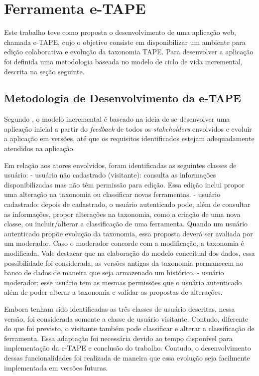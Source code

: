 \chapter[Ferramenta]{Ferramenta e-TAPE}
\label{cap:cap3}
Este trabalho teve como proposta o desenvolvimento de uma aplicação web, chamada e-TAPE, cujo o objetivo consiste em disponibilizar um ambiente para edição colaborativa e evolução da taxonomia TAPE.
Para desenvolver a aplicação foi definida uma metodologia baseada no modelo de ciclo de vida incremental, descrita na seção seguinte.

\section {Metodologia de Desenvolvimento da e-TAPE}
\label{sec:desenvolvimento}
\par
Segundo , o modelo incremental é baseado na ideia de se desenvolver uma aplicação inicial a partir do \textit{feedback} de todos os \textit{stakeholders} envolvidos e evoluir a aplicação em versões, até que os requisitos identificados estejam adequadamente atendidos na aplicação. 

\par
Em relação aos atores envolvidos, foram identificadas as seguintes classes de usuário:
- usuário não cadastrado (visitante): consulta as informações disponibilizadas mas não têm permissão para edição. Essa edição inclui propor uma alteração na taxonomia ou classificar novas ferramentas.
- usuário cadastrado: depois de cadastrado, o usuário autenticado pode, além de consultar as informações, propor alterações na taxonomia,  como a criação de uma nova classe, ou incluir/alterar a
classificação de uma ferramenta. Quando um usuário autenticado propõe evolução da taxonomia, essa proposta deverá ser avaliada por um moderador. Caso o moderador concorde com a modificação,  a taxonomia é modificada. Vale destacar que na elaboração do modelo conceitual dos dados, essa possibilidade foi considerada, as versões antigas da taxonomia permanecem no banco de dados de maneira que seja armazenado
um histórico. 
- usuário moderador: esse usuário tem as mesmas permissões que o usuário autenticado além de poder alterar a taxonomia e validar as propostas de alterações. 

\par
Embora tenham sido identificadas as três classes de usuário descritas, nessa versão, foi considerada somente a classe de usuário visitante. Contudo, diferente do que foi previsto, o visitante também pode classificar e alterar a classificação de ferramenta. Essa adaptação foi necessária devido ao tempo disponível para implementação da e-TAPE
e conclusão do trabalho. Contudo, o desenvolvimento dessas funcionalidades foi realizada de maneira que essa evolução seja facilmente implementada em versões futuras.



